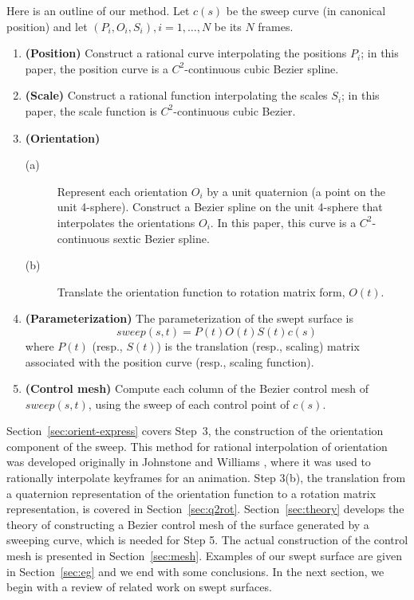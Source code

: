 Here is an outline of our method.
Let $c(s)$ be the sweep curve (in canonical position) and 
let $(P_i,O_i,S_i), i = 1,\ldots,N$ be its $N$ frames.

\begin{enumerate}
\item
	{\bf (Position)} Construct a rational curve
	interpolating the positions $P_i$;
	in this paper, the position curve is 
	a $C^2$-continuous cubic Bezier spline.
\item
	{\bf (Scale)} Construct a rational function
	interpolating the scales $S_i$; in this paper, 
	the scale function is $C^2$-continuous cubic Bezier.
\item
	{\bf (Orientation)}
\begin{description}
\item[(a)]
	Represent each orientation $O_i$ by a unit quaternion
	(a point on the unit 4-sphere).
	Construct a Bezier spline on the unit 4-sphere
	that interpolates the orientations $O_i$.
	In this paper, this curve is a $C^2$-continuous sextic Bezier spline.
\item[(b)]
	Translate the orientation function to rotation matrix form, $O(t)$.
\end{description}
\item 
	{\bf (Parameterization)}
	The parameterization of the swept surface is
\begin{equation}
\label{eqn:matrix}
	sweep(s,t) = P(t)O(t)S(t)c(s)
\end{equation}
	where $P(t)$ (resp., $S(t)$) is the translation (resp., scaling)
	matrix associated with the position curve (resp., scaling function).
\item
	{\bf (Control mesh)}
	Compute each column of the Bezier control mesh of $sweep(s,t)$,
	using the sweep of each control point of $c(s)$.
\end{enumerate}

Section~\ref{sec:orient-express} covers Step~3,
the construction of the orientation component of the sweep.
This method for rational interpolation of orientation
was developed originally in Johnstone and Williams \cite{jjjimbo94a}, 
where it was used to rationally interpolate keyframes for an animation.
Step 3(b), the translation from a quaternion representation of the
orientation function to a rotation matrix representation, is covered
in Section~\ref{sec:q2rot}.
Section~\ref{sec:theory} develops the 
theory of constructing a Bezier control mesh of the surface generated
by a sweeping curve, which is needed for Step 5.
The actual construction of the control mesh is presented in 
Section~\ref{sec:mesh}.
Examples of our swept surface are given in Section~\ref{sec:eg}
and we end with some conclusions.
In the next section, we begin with a review of related work on swept surfaces.


